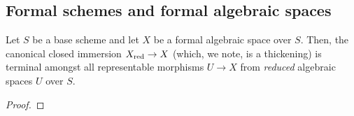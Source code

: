     \subsection{Formal schemes and formal algebraic spaces}
        \begin{lemma} \label{lemma: universal_property_of_thickenings}
            Let $S$ be a base scheme and let $X$ be a formal algebraic space over $S$. Then, the canonical closed immersion $X_{\mathrm{red}} \to X$ (which, we note, is a thickening) is terminal amongst all representable morphisms $U \to X$ from \textit{reduced} algebraic spaces $U$ over $S$.  
        \end{lemma}
            \begin{proof}
            \end{proof}